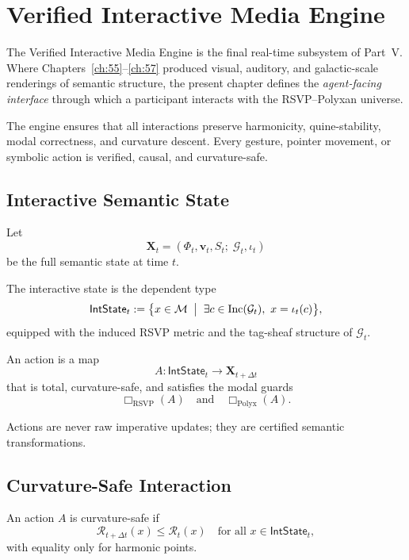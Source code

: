 \chapter{Verified Interactive Media Engine}
\label{ch:58}

The Verified Interactive Media Engine is the final real-time subsystem of 
Part~V.  
Where Chapters~\ref{ch:55}--\ref{ch:57} produced visual, auditory, and
galactic-scale renderings of semantic structure, the present chapter defines 
the \emph{agent-facing interface} through which a participant interacts with 
the RSVP--Polyxan universe.

The engine ensures that all interactions preserve harmonicity, 
quine-stability, modal correctness, and curvature descent.  
Every gesture, pointer movement, or symbolic action is verified, causal,
and curvature-safe.

\section{Interactive Semantic State}
\label{sec:58:state}

Let 
\[
\mathbf{X}_t 
= (\Phi_t, \mathbf{v}_t, S_t;\; \mathcal{G}_t,\iota_t)
\]
be the full semantic state at time $t$.

\begin{definition}
The interactive state is the dependent type
\[
\mathsf{IntState}_t 
:= \bigl\{ 
   x \in \mathcal{M} \;\bigm|\; 
   \exists c\in\mathrm{Inc}(\mathcal{G}_t),\ 
   x=\iota_t(c)
   \bigr\},
\]
equipped with the induced RSVP metric and the tag-sheaf structure of 
$\mathcal{G}_t$.
\end{definition}

\begin{definition}
An action is a map
\[
A : \mathsf{IntState}_t \to \mathbf{X}_{t+\Delta t}
\]
that is total, curvature-safe, and satisfies the modal guards
\[
\Box_{\mathrm{RSVP}}(A) 
\quad\text{and}\quad 
\Box_{\mathrm{Polyx}}(A).
\]
\end{definition}

Actions are never raw imperative updates; they are certified semantic
transformations.

\section{Curvature-Safe Interaction}
\label{sec:58:curvature}

\begin{definition}
An action $A$ is curvature-safe if
\[
\mathcal{R}_{t+\Delta t}(x) 
\le \mathcal{R}_t(x)
\quad\text{for all } x\in\mathsf{IntState}_t,
\]
with equality only for harmonic points.
\end{definition}

